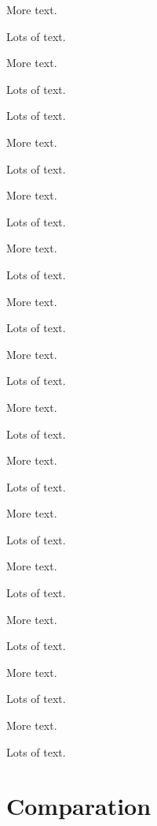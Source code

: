 \documentclass{sigplanconf}
\begin{document}
More text.

Lots of text.

More text.

Lots of text.


Lots of text.

More text.

Lots of text.

More text.

Lots of text.

More text.

Lots of text.

More text.

Lots of text.

More text.

Lots of text.

More text.

Lots of text.

More text.

Lots of text.

More text.

Lots of text.

More text.

Lots of text.

More text.

Lots of text.

More text.

Lots of text.

More text.

Lots of text.

\appendix
\section{Comparation}
\end{document}
